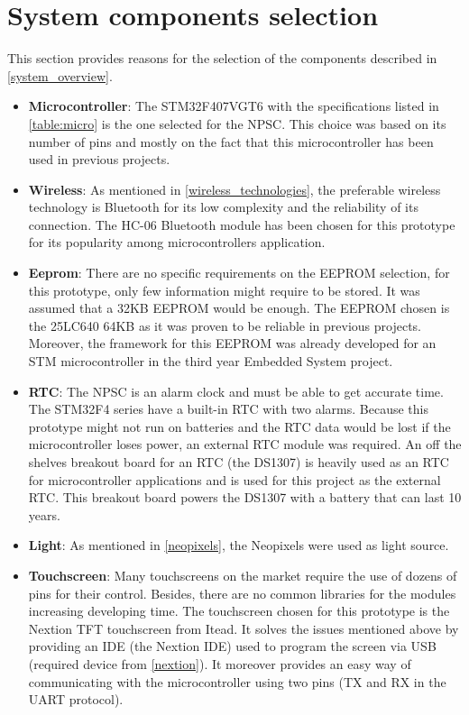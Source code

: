\section{System components selection}
This section provides reasons for the selection of the components described in \ref{system_overview}.  
\begin{itemize}
\item \textbf{Microcontroller}: The STM32F407VGT6 with the specifications listed in \cref{table:micro} is the one selected for the NPSC. This choice was based on its number of pins and mostly on the fact that this microcontroller has been used in previous projects. 
\item \textbf{Wireless}: As mentioned in \ref{wireless_technologies}, the preferable wireless technology is Bluetooth for its low complexity and the reliability of its connection. The HC-06 Bluetooth module has been chosen for this prototype for its popularity among microcontrollers application.
\item \textbf{Eeprom}: There are no specific requirements on the EEPROM selection, for this prototype, only few information might require to be stored. It was assumed that a 32KB EEPROM would be enough. The EEPROM chosen is the 25LC640 64KB as it was proven to be reliable in previous projects. Moreover, the framework for this EEPROM was already developed for an STM microcontroller in the third year Embedded System project.  
\item \textbf{RTC}: The NPSC is an alarm clock and must be able to get accurate time. The STM32F4 series have a built-in RTC with two alarms. Because this prototype might not run on batteries and the RTC data would be lost if the microcontroller loses power, an external RTC module was required. An off the shelves breakout board for an RTC (the DS1307) is heavily used as an RTC for microcontroller applications and is used for this project as the external RTC. This breakout board powers the DS1307 with a battery that can last 10 years.
\item \textbf{Light}: As mentioned in \ref{neopixels}, the Neopixels were used as light source.
\item \textbf{Touchscreen}: Many touchscreens on the market require the use of dozens of pins for their control. Besides, there are no common libraries for the modules increasing developing time. The touchscreen chosen for this prototype is the Nextion TFT touchscreen from Itead. It solves the issues mentioned above by providing an IDE (the Nextion IDE) used to program the screen via USB (required device from \ref{nextion}). It moreover provides an easy way of communicating with the microcontroller using two pins (TX and RX in the UART protocol).
\end{itemize}

